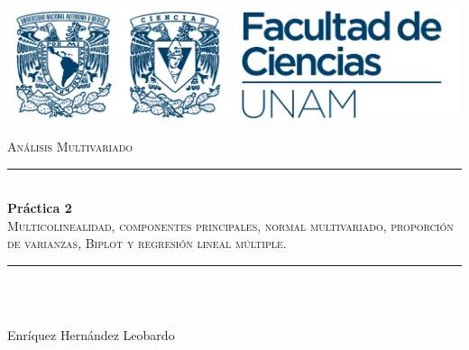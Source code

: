 \begin{titlepage}
	
	\newcommand{\HRule}{\rule{\linewidth}{0.5mm}} %
	
	\center %
	
	\includegraphics[]{logoFC_UNAM.png}\\ %
	
	\hspace*{2cm}

	\textsc{\large  Análisis Multivariado}\\[1.5cm] 
	
	
	\HRule \\[0.4cm]
	{ \Large \bfseries Práctica 2}\\[0.4cm] %
	\textsc{\Large Multicolinealidad, componentes principales, normal multivariado, proporción de varianzas, Biplot y regresión lineal múltiple.}\\[1cm] %
	\HRule \\[1.2cm]
	
	
	\begin{minipage}{0.4\textwidth}
		\begin{flushleft} \large
			\emph{}\\
Enríquez Hernández Leobardo\\
		\end{flushleft}
	\end{minipage}
	~


\end{titlepage}
